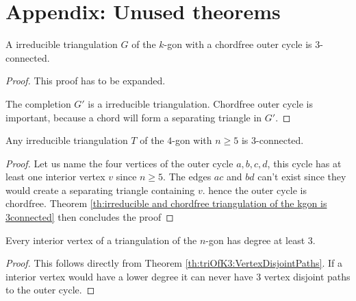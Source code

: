 
\section{Appendix: Unused theorems}


\begin{thrm}
\label{th:irreducible and chordfree triangulation of the kgon is 3connected}
A irreducible triangulation $G$ of the $k$-gon with a chordfree outer cycle is $3$-connected.
\end{thrm}
\begin{proof}
  This proof has to be expanded.

  The completion $G'$ is a irreducible triangulation. Chordfree outer cycle is important, because a chord will form a separating triangle in $G'$.
\end{proof}

\begin{thrm}
  Any irreducible triangulation $T$ of the $4$-gon with $n \geq 5$ is $3$-connected.
\end{thrm}
\begin{proof}
  Let us name the four vertices of the outer cycle $a,b,c,d$, this cycle has at least one interior vertex $v$ since $n\geq 5$. The edges $ac$ and $bd$ can't exist since they would create a separating triangle containing $v$. hence the outer cycle is chordfree.
  Theorem \ref{th:irreducible and chordfree triangulation of the kgon is 3connected} then concludes the proof
\end{proof}


\begin{thrm}
  Every interior vertex of a triangulation of the $n$-gon has degree at least $3$.
\end{thrm}

\begin{proof}
  This follows directly from Theorem \ref{th:triOfK3:VertexDisjointPaths}. If a interior vertex would have a lower degree it can never have $3$ vertex disjoint paths to the outer cycle.
\end{proof}


